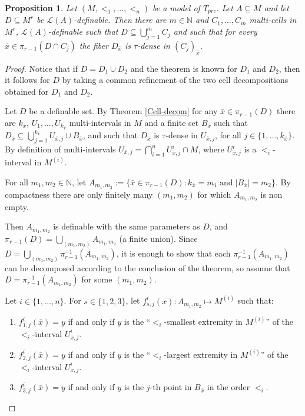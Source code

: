 \documentclass[12pt]{article}
\newtheorem{prop}[thm]{Proposition}
\theoremstyle{definition}
\theoremstyle{mystyle}
\theoremstyle{remark}
\newcommand{\clos}[2]{#1^{(#2)}}
\begin{document}
\begin{prop}\label{UniformDecom}
Let $(M, <_1, \ldots, <_n)$ be a model of $T_{prc}$. Let $A
\subseteq M$ and let $D\subseteq M^r$ be
$\mathcal{L}(A)$-definable. Then there are $m \in \mathbb{N}$ and
$C_1, \ldots, C_m$ multi-cells in $M^r$, $\mathcal{L}(A)$-definable such
that $D \subseteq \bigcup_{j=1}^m {C_j}$ and such that for every
$\bar{x} \in \pi_{r-1}(D\cap C_j)$ the fiber $D_{\bar x}$ is $\tau$-dense
in $(C_j)_{\bar x}$.
\end{prop}
\begin{proof}

Notice that if $D=D_1 \cup D_2$ and the theorem is known for $D_1$ and $D_2$, then it follows for $D$ by taking a common refinement of the two cell decompositions obtained for $D_1$ and $D_2$.

Let $D$ be a definable set. By Theorem \ref{Cell-decom} for any  $\bar{x} \in \pi_{r-1}(D)$
there are $k_{\bar{x}}$, $U_1, \ldots, U_{k_{\bar{x}}}$
multi-intervals in $M$ and a finite set $B_{\bar{x}}$ such that
$D_{\bar{x}} \subseteq \displaystyle{\bigcup_{j=1}^{k_{\bar{x}}}
U_{\bar{x},j}} \cup B_{\bar{x}}$, and such that $D_{\bar{x}}$ is
$\tau$-dense in $U_{\bar{x},j}$, for all $j \in \{1, \ldots,
k_{\bar{x}}\}$. By definition of multi-intervals $U_{\bar{x},j}=
\displaystyle{\bigcap_{i=1}^n}U_{\bar{x}, j}^i \cap M$, where
$U_{\bar{x}, j}^i$ is a $<_i$-interval in $\clos{M}{i}$.



\medskip

For all $m_1, m_2\in \mathbb N$, let $A_{m_1,m_2}:= \{\bar{x} \in
\pi_{r-1}(D): k_{\bar{x}} = m_1 \; \mbox{and} \; |B_{\bar{x}}|=m_2
\}$. By compactness there are only finitely many $(m_1,m_2)$ for
which $A_{m_1,m_2}$ is non empty.

Then $A_{m_1, m_2}$ is definable with the same parameters as
$D$, and $\pi_{r-1}(D)= \bigcup_{(m_1, m_2)} A_{m_1, m_2}$ (a
finite union). Since $D= \bigcup_{(m_1, m_2)} \pi_{r-1}^{-1}(
A_{m_1, m_2})$, it is enough to show that each
$\pi_{r-1}^{-1}( A_{m_1, m_2})$ can be decomposed according to the
conclusion of the theorem, so assume that $D=\pi_{r-1}^{-1}
( A_{m_1, m_2})$ for some $(m_1, m_2)$.


\medskip

Let $i \in \{1, \ldots, n\}$. For $s \in \{1,2,3\}$, let $f_{s,j}^i(x): A_{m_1, m_2}\mapsto \clos{M}{i}$ such that:

\begin{enumerate}
 \item $f^i_{1,j}(\bar{x}) = y$ if and only if $y$ is the ``$<_i$-smallest extremity in $\clos{M}{i}$'' of the $<_i$-interval $U^i_{\bar{x}, j}$.
 \item $f^i_{2,j}(\bar{x}) = y$ if and only if $y$ is the ``$<_i$-largest extremity in $\clos{M}{i}$'' of the $<_i$-interval $U^i_{\bar{x},j}$.
\item $f^i_{3,j}(\bar{x}) = y$ if and only if $y$ is the $j$-th
point in $B_{\bar x}$ in the order $<_i$.
\end{enumerate}


\end{proof}
\end{document}
